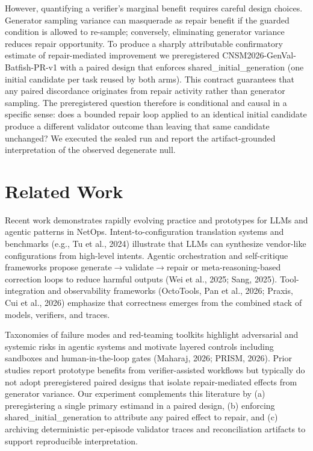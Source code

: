 \documentclass[conference]{IEEEtran}
\begin{document}
However, quantifying a verifier's marginal benefit requires careful design choices. Generator sampling variance can masquerade as repair benefit if the guarded condition is allowed to re-sample; conversely, eliminating generator variance reduces repair opportunity. To produce a sharply attributable confirmatory estimate of repair-mediated improvement we preregistered CNSM2026-GenVal-Batfish-PR-v1 with a paired design that enforces shared\_initial\_generation (one initial candidate per task reused by both arms). This contract guarantees that any paired discordance originates from repair activity rather than generator sampling. The preregistered question therefore is conditional and causal in a specific sense: does a bounded repair loop applied to an identical initial candidate produce a different validator outcome than leaving that same candidate unchanged? We executed the sealed run and report the artifact-grounded interpretation of the observed degenerate null.

\section{Related Work}
Recent work demonstrates rapidly evolving practice and prototypes for LLMs and agentic patterns in NetOps. Intent-to-configuration translation systems and benchmarks (e.g., Tu et al., 2024) illustrate that LLMs can synthesize vendor-like configurations from high-level intents. Agentic orchestration and self-critique frameworks propose generate\ensuremath{\rightarrow}validate\ensuremath{\rightarrow}repair or meta-reasoning-based correction loops to reduce harmful outputs (Wei et al., 2025; Sang, 2025). Tool-integration and observability frameworks (OctoTools, Pan et al., 2026; Praxis, Cui et al., 2026) emphasize that correctness emerges from the combined stack of models, verifiers, and traces.

Taxonomies of failure modes and red-teaming toolkits highlight adversarial and systemic risks in agentic systems and motivate layered controls including sandboxes and human-in-the-loop gates (Maharaj, 2026; PRISM, 2026). Prior studies report prototype benefits from verifier-assisted workflows but typically do not adopt preregistered paired designs that isolate repair-mediated effects from generator variance. Our experiment complements this literature by (a) preregistering a single primary estimand in a paired design, (b) enforcing shared\_initial\_generation to attribute any paired effect to repair, and (c) archiving deterministic per-episode validator traces and reconciliation artifacts to support reproducible interpretation.
\end{document}

